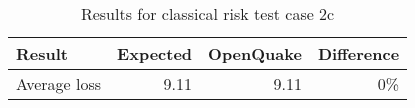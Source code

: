\begin{table}[htbp]

\centering
\begin{tabular}{ l r r r }

\hline
\rowcolor{anti-flashwhite}
\bf{Result} & \bf{Expected} & \bf{OpenQuake} & \bf{Difference}\\
\hline
Average loss & 9.11 & 9.11 & 0\% \\
\hline
\end{tabular}

\caption{Results for classical risk test case 2c}
\label{tab:result-cr-2c}
\end{table}
